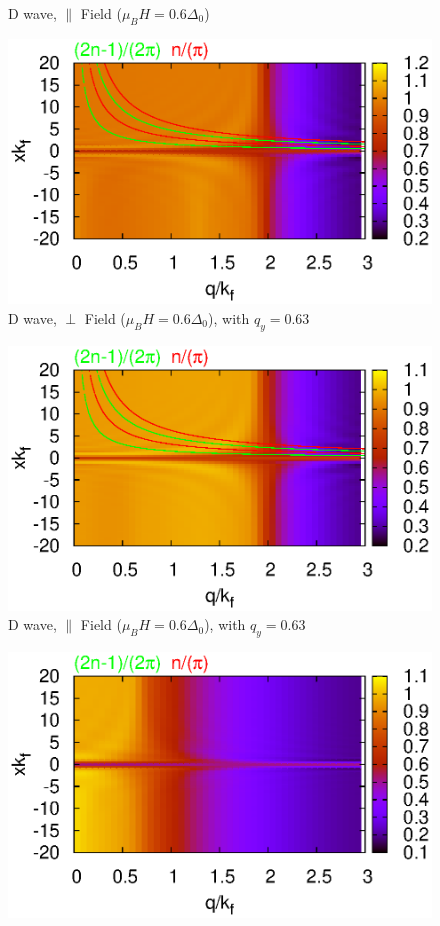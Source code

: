 \documentclass[aps,prl,twocolumn,showpacs,amsmath,amssymb]{revtex4-1}
\begin{document}
\begin{widetext}
\begin{figure}
\caption{ 
	\label{fig:qq} D wave, $\parallel$ Field ($\mu_B H=0.6\Delta_0$)
} 
\end{figure}
\begin{figure}
\includegraphics[width=0.7\linewidth]{surface_perp_d_Fqs.eps}
\caption{ 
	\label{fig:qq} D wave, $\perp$ Field ($\mu_B H=0.6\Delta_0$), with $q_y = 0.63$
} 
\end{figure}
\begin{figure}
\includegraphics[width=0.7\linewidth]{surface_para_d_Fqs.eps}
\caption{ 
	\label{fig:qq} D wave, $\parallel$ Field ($\mu_B H=0.6\Delta_0$), with $q_y = 0.63$
} 
\end{figure}
\begin{figure}
\includegraphics[width=0.7\linewidth]{surface_perp_d_Fql.eps}

\end{figure}
\end{widetext}
\end{document}
